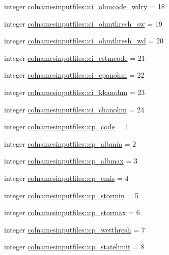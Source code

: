 \begin{DoxyCompactItemize}
\item 
integer \hyperlink{namespacecolnamesinputfiles_a62b48f3cc7c912282406d028654618b3}{colnamesinputfiles\+::ci\+\_\+ohmcode\+\_\+wdry} = 18
\item 
integer \hyperlink{namespacecolnamesinputfiles_a8c093c3054c5b97cfd48aa5a2643eccd}{colnamesinputfiles\+::ci\+\_\+ohmthresh\+\_\+sw} = 19
\item 
integer \hyperlink{namespacecolnamesinputfiles_af2567526f99cc8ea7b6408d4725041f3}{colnamesinputfiles\+::ci\+\_\+ohmthresh\+\_\+wd} = 20
\item 
integer \hyperlink{namespacecolnamesinputfiles_a20ecd4ea66a4c0db6adf4c07786ed888}{colnamesinputfiles\+::ci\+\_\+estmcode} = 21
\item 
integer \hyperlink{namespacecolnamesinputfiles_ac575448f7cd32bb1c4f0498c6ad06ce2}{colnamesinputfiles\+::ci\+\_\+cpanohm} = 22
\item 
integer \hyperlink{namespacecolnamesinputfiles_a03e019e33b459e1ec60dac2b255e855f}{colnamesinputfiles\+::ci\+\_\+kkanohm} = 23
\item 
integer \hyperlink{namespacecolnamesinputfiles_ac9bea22a1fcf8544d503fd4844d70c89}{colnamesinputfiles\+::ci\+\_\+chanohm} = 24
\item 
integer \hyperlink{namespacecolnamesinputfiles_ab2ca2803ce3dfc8561661c95706214f3}{colnamesinputfiles\+::cp\+\_\+code} = 1
\item 
integer \hyperlink{namespacecolnamesinputfiles_aab15b20d4124b71f85c7a104e53bea16}{colnamesinputfiles\+::cp\+\_\+albmin} = 2
\item 
integer \hyperlink{namespacecolnamesinputfiles_a85b7aae31305b8708ef744a4b85b09a7}{colnamesinputfiles\+::cp\+\_\+albmax} = 3
\item 
integer \hyperlink{namespacecolnamesinputfiles_a22912542114e1af66f477bf7fa7cb5fb}{colnamesinputfiles\+::cp\+\_\+emis} = 4
\item 
integer \hyperlink{namespacecolnamesinputfiles_a5503aa0af956bc5f68cf462e5b70a7f4}{colnamesinputfiles\+::cp\+\_\+stormin} = 5
\item 
integer \hyperlink{namespacecolnamesinputfiles_a3e39597df40b3e58c35082b381dddbac}{colnamesinputfiles\+::cp\+\_\+stormax} = 6
\item 
integer \hyperlink{namespacecolnamesinputfiles_a8e548544469fb8f359551f0aea2d2069}{colnamesinputfiles\+::cp\+\_\+wetthresh} = 7
\item 
integer \hyperlink{namespacecolnamesinputfiles_a06581c0ce3961889b7b9f77b1a490c5d}{colnamesinputfiles\+::cp\+\_\+statelimit} = 8

\end{DoxyCompactItemize}
